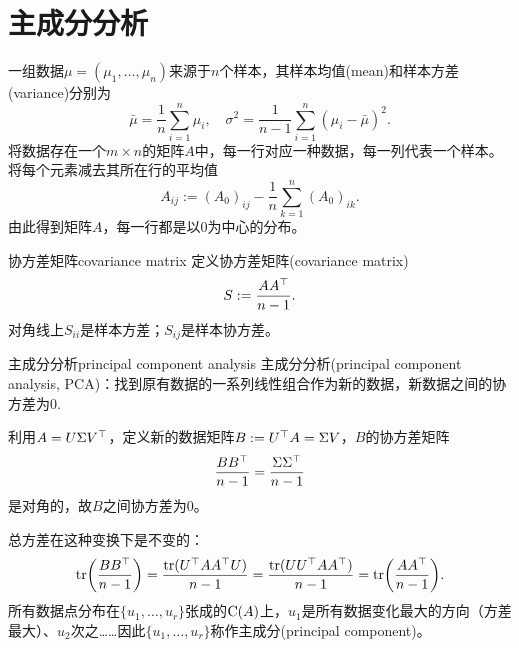 \section{主成分分析}
一组数据$\mu=(\mu_1,\ldots,\mu_n)$来源于$n$个样本，其样本均值(mean)和样本方差(variance)分别为
\[
	\bar\mu=\frac1n\sum_{i=1}^n\mu_i,\quad\sigma^2=\frac1{n-1}\sum_{i=1}^n(\mu_i-\bar\mu)^2.
\]
将数据存在一个$m\times n$的矩阵$A$中，每一行对应一种数据，每一列代表一个样本。将每个元素减去其所在行的平均值
\[
	A_{ij}:=(A_0)_{ij}-\frac1n\sum_{k=1}^n(A_0)_{ik}.
\]
由此得到矩阵$A$，每一行都是以0为中心的分布。
\begin{definition}{协方差矩阵}{covariance matrix}
	定义协方差矩阵(covariance matrix)
	\begin{equation}
		S:=\frac{AA^\top}{n-1}.
	\end{equation}
	对角线上$S_{ii}$是样本方差；$S_{ij}$是样本协方差。
\end{definition}
\begin{method}{主成分分析}{principal component analysis}
	主成分分析(principal component analysis, PCA)：找到原有数据的一系列线性组合作为新的数据，新数据之间的协方差为0.
\end{method}
利用$A=U\Sigma V^\top$，定义新的数据矩阵$B:=U^\top A=\Sigma V$，$B$的协方差矩阵
\[
	\frac{BB^\top}{n-1}=\frac{\Sigma\Sigma^\top}{n-1}
\]
是对角的，故$B$之间协方差为0。

总方差在这种变换下是不变的：
\[
	\operatorname{tr}\biggl(\frac{BB^\top}{n-1}\biggr)=\frac{\operatorname{tr}(U^\top AA^\top U)}{n-1}=\frac{\operatorname{tr}(UU^\top AA^\top)}{n-1}=\operatorname{tr}\biggl(\frac{AA^\top}{n-1}\biggr).
\]
所有数据点分布在$\{u_1,\ldots,u_r\}$张成的$\operatorname{C}(A)$上，$u_1$是所有数据变化最大的方向（方差最大）、$u_2$次之……因此$\{u_1,\ldots,u_r\}$称作主成分(principal component)。
